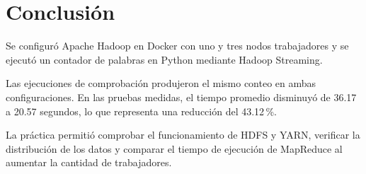 \section{Conclusión}

Se configuró Apache Hadoop en Docker con uno y tres 
nodos trabajadores y se ejecutó un contador de palabras 
en Python mediante Hadoop Streaming.

Las ejecuciones de comprobación produjeron el mismo 
conteo en ambas configuraciones. En las pruebas medidas, 
el tiempo promedio disminuyó de 36.17 a 20.57 segundos, 
lo que representa una reducción del 43.12\,\%.

La práctica permitió comprobar el funcionamiento de HDFS 
y YARN, verificar la distribución de los datos y comparar 
el tiempo de ejecución de MapReduce al aumentar 
la cantidad de trabajadores.